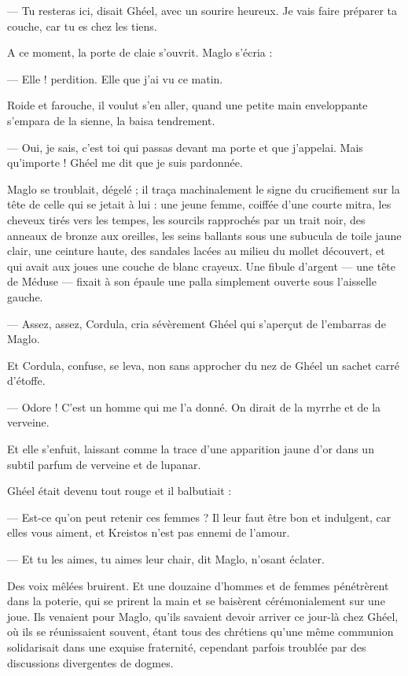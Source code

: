 \documentclass[a4paper, 11pt, oneside, polutonikogreek, french]{article}
\begin{document}
--- Tu resteras ici, disait Ghéel, avec un sourire heureux. Je vais faire préparer ta couche, car tu es chez les tiens.

A ce moment, la porte de claie s'ouvrit. Maglo s'écria :

--- Elle ! perdition. Elle que j'ai vu ce matin.

Roide et farouche, il voulut s'en aller, quand une petite main enveloppante s'empara de la sienne, la baisa tendrement.

--- Oui, je sais, c'est toi qui passas devant ma porte et que j'appelai. Mais qu'importe ! Ghéel me dit que je suis pardonnée.

Maglo se troublait, dégelé ; il traça machinalement le signe du crucifiement sur la tête de celle qui se jetait à lui : une jeune femme, coiffée d'une courte mitra, les cheveux tirés vers les tempes, les sourcils rapprochés par un trait noir, des anneaux de bronze aux oreilles, les seins ballants sous une subucula de toile jaune clair, une ceinture haute, des sandales lacées au milieu du mollet découvert, et qui avait aux joues une couche de blanc crayeux. Une fibule d'argent --- une tête de Méduse --- fixait à son épaule une palla simplement ouverte sous l'aisselle gauche.

--- Assez, assez, Cordula, cria sévèrement Ghéel qui s'aperçut de l'embarras de Maglo.

Et Cordula, confuse, se leva, non sans approcher du nez de Ghéel un sachet carré d'étoffe.

--- Odore ! C'est un homme qui me l'a donné. On dirait de la myrrhe et de la verveine.

Et elle s'enfuit, laissant comme la trace d'une apparition jaune d'or dans un subtil parfum de verveine et de lupanar.

Ghéel était devenu tout rouge et il balbutiait :

--- Est-ce qu'on peut retenir ces femmes ? Il leur faut être bon et indulgent, car elles vous aiment, et Kreistos n'est pas ennemi de l'amour.

--- Et tu les aimes, tu aimes leur chair, dit Maglo, n'osant éclater.

Des voix mêlées bruirent. Et une douzaine d'hommes et de femmes pénétrèrent dans la poterie, qui se prirent la main et se baisèrent cérémonialement sur une joue. Ils venaient pour Maglo, qu'ils savaient devoir arriver ce jour-là chez Ghéel, où ils se réunissaient souvent, étant tous des chrétiens qu'une même communion solidarisait dans une exquise fraternité, cependant parfois troublée par des discussions divergentes de dogmes.
\end{document}
